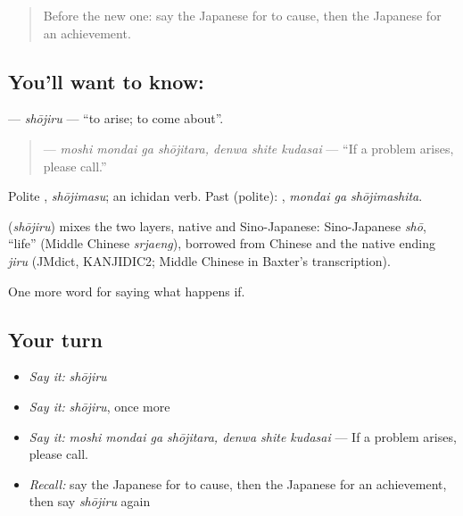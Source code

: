 \label{lesson:JA-C511-shoujiru}



\begin{quote}
Before the new one: say the Japanese for to cause, then the Japanese for an achievement.
\end{quote}

\subsection*{You'll want to know: }
\textbf{} — \emph{shōjiru} — \textquotedblleft{}to arise; to come about\textquotedblright{}.

\begin{quote}
\textbf{   } — \emph{moshi mondai ga shōjitara, denwa shite kudasai} — \textquotedblleft{}If a problem arises, please call.\textquotedblright{}
\end{quote}

Polite \textbf{}, \emph{shōjimasu}; an ichidan verb. Past (polite): \textbf{ }, \emph{mondai ga shōjimashita}.

\begin{cousinweb}
\textbf{} (\emph{shōjiru}) mixes the two layers, native and Sino-Japanese: Sino-Japanese \emph{shō}, \textquotedblleft{}life\textquotedblright{} (Middle Chinese \emph{srjaeng}), borrowed from Chinese and the native ending \emph{jiru} (JMdict, KANJIDIC2; Middle Chinese in Baxter's transcription).
\end{cousinweb}

\begin{grammarlens}[title={What you've built}]
One more word for saying what happens if.
\end{grammarlens}

\subsection*{Your turn}
\begin{itemize}
\raggedright
  \item \emph{Say it:} \emph{shōjiru}
  \item \emph{Say it:} \emph{shōjiru}, once more
  \item \emph{Say it:} \emph{moshi mondai ga shōjitara, denwa shite kudasai} — If a problem arises, please call.
  \item \emph{Recall:} say the Japanese for to cause, then the Japanese for an achievement, then say \emph{shōjiru} again
\end{itemize}

